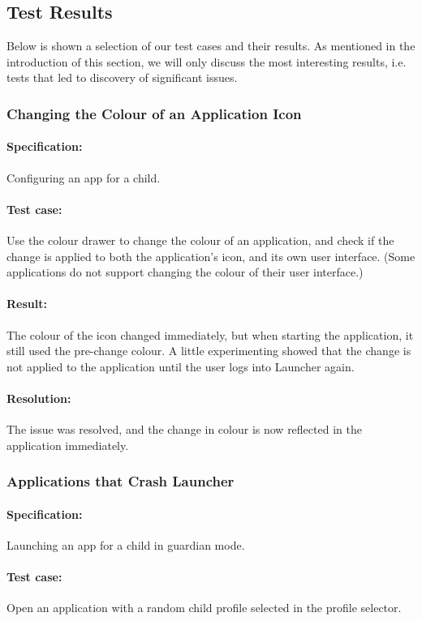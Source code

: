 \subsection{Test Results}
Below is shown a selection of our test cases and their results.
As mentioned in the introduction of this section, we will only discuss the most interesting results, i.e. tests that led to discovery of significant issues.

\subsubsection*{Changing the Colour of an Application Icon}
\paragraph{Specification:} Configuring an app for a child.
\paragraph{Test case:} Use the colour drawer to change the colour of an application, and check if the change is applied to both the application's icon, and its own user interface. (Some applications do not support changing the colour of their user interface.)
\paragraph{Result:} The colour of the icon changed immediately, but when starting the application, it still used the pre-change colour. A little experimenting showed that the change is not applied to the application until the user logs into Launcher again.
\paragraph{Resolution:} The issue was resolved, and the change in colour is now reflected in the application immediately.

\subsubsection*{Applications that Crash Launcher}
\paragraph{Specification:} Launching an app for a child in guardian mode.
\paragraph{Test case:} Open an application with a random child profile selected in the profile selector.
